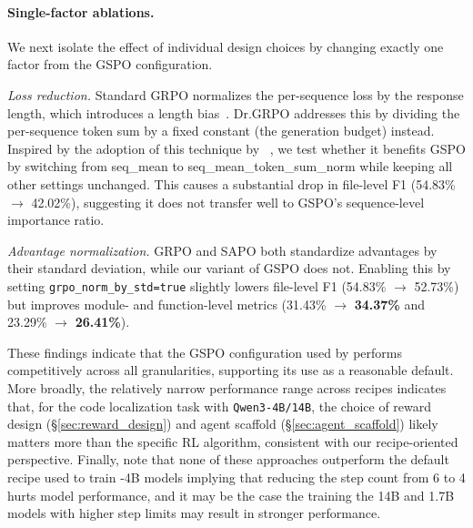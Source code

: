 \paragraph{Single-factor ablations.}
We next isolate the effect of individual design choices by changing exactly one factor from the GSPO configuration.

\emph{Loss reduction.} Standard GRPO normalizes the per-sequence loss by the response length, which introduces a length bias~\citep{liu2025understandingr1zeroliketrainingcritical}. Dr.GRPO addresses this by dividing the per-sequence token sum by a fixed constant (the generation budget) instead. Inspired by the adoption of this technique by ~\citet{cognition2025swegrep}, we test whether it benefits GSPO by switching from seq\_mean to  seq\_mean\_token\_sum\_norm while keeping all other settings unchanged. This causes a substantial drop in file-level F1 (54.83\% $\to$ 42.02\%), suggesting it does not transfer well to GSPO's sequence-level importance ratio.

\emph{Advantage normalization.} GRPO and SAPO both standardize advantages by their standard deviation, while our variant of GSPO does not. Enabling this by setting \texttt{grpo\_norm\_by\_std=true} slightly lowers file-level F1 (54.83\% $\to$ 52.73\%) but improves module- and function-level metrics (31.43\% $\to$ \textbf{34.37\%} and 23.29\% $\to$ \textbf{26.41\%}).

These findings indicate that the GSPO configuration used by \methodname performs competitively across all granularities, supporting its use as a reasonable default. More broadly, the relatively narrow performance range across recipes indicates that, for the code localization task with \texttt{Qwen3-4B/14B}, the choice of reward design (\S\ref{sec:reward_design}) and agent scaffold (\S\ref{sec:agent_scaffold}) likely matters more than the specific RL algorithm, consistent with our recipe-oriented perspective. Finally, note that none of these approaches outperform the default recipe used to train \methodname-4B models implying that reducing the step count from 6 to 4 hurts model performance, and it may be the case the training the 14B and 1.7B models with higher step limits may result in stronger performance.
  


